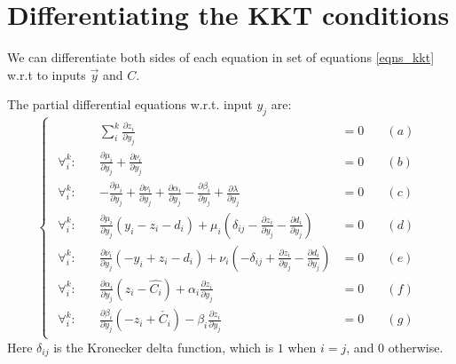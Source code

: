 \documentclass[11 pt]{article}
\begin{document}
\section{Differentiating the KKT conditions}

We can differentiate both sides of each equation in set of equations \ref{eqns_kkt} w.r.t to inputs $\vec{y}$ and $C$.  

The partial differential equations w.r.t. input $y_j$ are:
\begin{equation}\label{eqns_wrt_y_j}
    \begin{cases}
        \begin{aligned}
            & \sum_i^k \frac{\partial z_i}{\partial y_j} & = 0 &\quad (a)\\
            
            \forall_i^k : \quad & \frac{\partial\mu_i}{\partial y_j} + \frac{\partial \nu_i}{\partial y_j} & = 0 &\quad (b)\\
            
            \forall_i^k : \quad & -\frac{\partial \mu_i}{\partial y_j} + \frac{\partial \nu_i}{\partial y_j} + \frac{\partial \alpha_i}{\partial y_j} - \frac{\partial \beta_i}{\partial y_j} + \frac{\partial \lambda}{\partial y_j} & = 0 &\quad (c)\\
            
            \forall_i^k : \quad & \frac{\partial \mu_i}{\partial y_j}(y_i - z_i - d_i) + \mu_i (\delta_{ij} - \frac{\partial z_i}{\partial y_j} - \frac{\partial d_i}{\partial y_j}) & = 0 &\quad (d)\\
            
            \forall_i^k : \quad & \frac{\partial \nu_i}{\partial y_j}(- y_i + z_i - d_i) + \nu_i(-\delta_{ij} + \frac{\partial z_i}{\partial y_j} - \frac{\partial d_i}{\partial y_j}) & = 0 &\quad (e)\\
            
            \forall_i^k : \quad & \frac{\partial \alpha_i}{\partial y_j}(z_i - \hat{C_i}) + \alpha_i \frac{\partial z_i}{\partial y_j} & = 0 &\quad (f)\\
            
            \forall_i^k : \quad & \frac{\partial \beta_i}{\partial y_j}(-z_i + \check{C_i}) - \beta_i \frac{\partial z_i}{\partial y_j}& = 0 &\quad (g)
        \end{aligned}
    \end{cases}
\end{equation}
Here $\delta_{ij}$ is the Kronecker delta function, which is $1$ when $i=j$, and $0$ otherwise.
\end{document}

